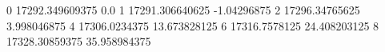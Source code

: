 0 17292.349609375 0.0
1 17291.306640625 -1.04296875
2 17296.34765625 3.998046875
4 17306.0234375 13.673828125
6 17316.7578125 24.408203125
8 17328.30859375 35.958984375
